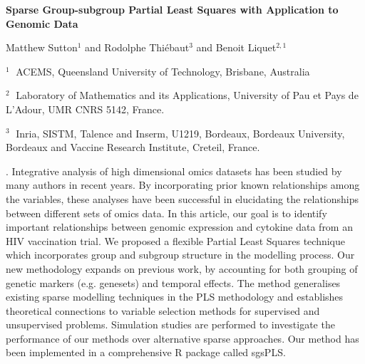 \documentclass[12pt]{article}
\begin{document}
\begin{flushleft}


{\LARGE\bf Sparse Group-subgroup Partial Least Squares with Application
to Genomic Data}


\vspace{1.0cm}

Matthew Sutton$^1$ and Rodolphe Thi\'{e}baut$^3$ and Benoit Liquet$^{2,1}$

\begin{description}

\item $^1 \;$ ACEMS, Queensland University of Technology, Brisbane, Australia

\item $^2 \;$ Laboratory of Mathematics and its Applications, University
of Pau et Pays de L’Adour, UMR CNRS 5142, France.

\item $^3 \;$ Inria, SISTM, Talence and Inserm, U1219, Bordeaux,
Bordeaux University, Bordeaux and Vaccine Research Institute, Creteil, France.

\end{description}

\end{flushleft}


\vspace{0.75cm}

. Integrative analysis of high dimensional omics datasets has been studied by many authors in recent years. By incorporating prior known relationships among the variables, these analyses have been successful in elucidating the relationships between different sets of omics data. In this article, our goal is to identify important relationships between genomic expression and cytokine data from an HIV vaccination trial. We proposed a flexible Partial Least Squares technique which incorporates group and subgroup structure in the modelling process. Our new methodology expands on previous work, by accounting for both grouping of genetic markers (e.g. genesets) and temporal effects. The method generalises existing sparse modelling techniques in the PLS methodology and establishes theoretical connections to variable selection methods for supervised and unsupervised problems. Simulation studies are performed to investigate the performance of our methods over alternative sparse approaches. Our method has been implemented in a comprehensive R package called sgsPLS.
\end{document}
